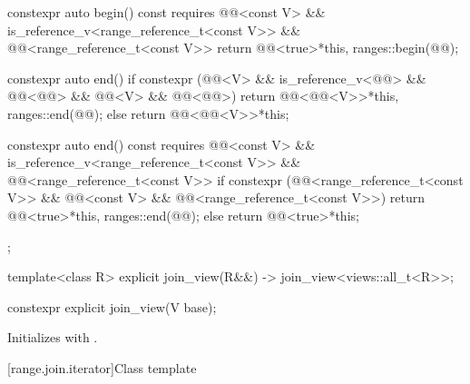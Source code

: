 \begin{codeblock}
{{    constexpr auto begin() const
      requires @@<const V> &&
               is_reference_v<range_reference_t<const V>> &&
               @@<range_reference_t<const V>>
    { return @@<true>{*this, ranges::begin(@@)}; }

    constexpr auto end() {
      if constexpr (@@<V> &&
                    is_reference_v<@@> && @@<@@> &&
                    @@<V> && @@<@@>)
        return @@<@@<V>>{*this, ranges::end(@@)};
      else
        return @@<@@<V>>{*this};
    }

    constexpr auto end() const
      requires @@<const V> &&
               is_reference_v<range_reference_t<const V>> &&
               @@<range_reference_t<const V>> {
      if constexpr (@@<range_reference_t<const V>> &&
                    @@<const V> &&
                    @@<range_reference_t<const V>>)
        return @@<true>{*this, ranges::end(@@)};
      else
        return @@<true>{*this};
    }
  };

  template<class R>
    explicit join_view(R&&) -> join_view<views::all_t<R>>;
}
\end{codeblock}

%
\begin{itemdecl}
constexpr explicit join_view(V base);
\end{itemdecl}

\begin{itemdescr}
\pnum
\effects
Initializes  with .
\end{itemdescr}

[range.join.iterator]{Class template }

